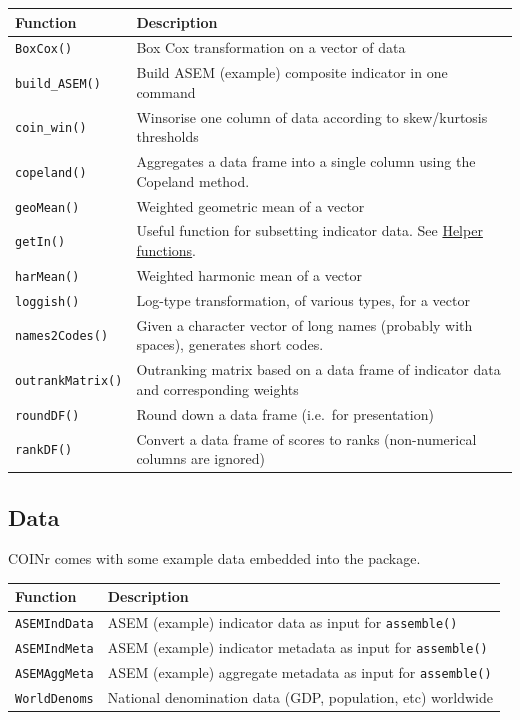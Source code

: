 \documentclass[
]{book}
\begin{document}
\begin{longtable}[]{@{}ll@{}}
\toprule
Function & Description \\
\midrule
\endhead
\texttt{BoxCox()} & Box Cox transformation on a vector of data \\
\texttt{build\_ASEM()} & Build ASEM (example) composite indicator in one command \\
\texttt{coin\_win()} & Winsorise one column of data according to skew/kurtosis thresholds \\
\texttt{copeland()} & Aggregates a data frame into a single column using the Copeland method. \\
\texttt{geoMean()} & Weighted geometric mean of a vector \\
\texttt{getIn()} & Useful function for subsetting indicator data. See \protect\hyperlink{helper-functions}{Helper functions}. \\
\texttt{harMean()} & Weighted harmonic mean of a vector \\
\texttt{loggish()} & Log-type transformation, of various types, for a vector \\
\texttt{names2Codes()} & Given a character vector of long names (probably with spaces), generates short codes. \\
\texttt{outrankMatrix()} & Outranking matrix based on a data frame of indicator data and corresponding weights \\
\texttt{roundDF()} & Round down a data frame (i.e.~for presentation) \\
\texttt{rankDF()} & Convert a data frame of scores to ranks (non-numerical columns are ignored) \\
\bottomrule
\end{longtable}

\hypertarget{data}{%
\subsection{Data}\label{data}}

COINr comes with some example data embedded into the package.

\begin{longtable}[]{@{}ll@{}}
\toprule
Function & Description \\
\midrule
\endhead
\texttt{ASEMIndData} & ASEM (example) indicator data as input for \texttt{assemble()} \\
\texttt{ASEMIndMeta} & ASEM (example) indicator metadata as input for \texttt{assemble()} \\
\texttt{ASEMAggMeta} & ASEM (example) aggregate metadata as input for \texttt{assemble()} \\
\texttt{WorldDenoms} & National denomination data (GDP, population, etc) worldwide \\
\bottomrule
\end{longtable}
\end{document}
